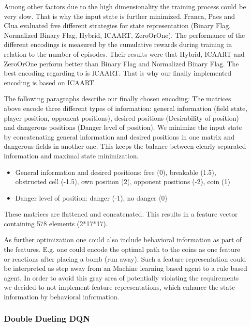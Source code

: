 Among other factors due to the high dimensionality the training process could be very slow. That is why the input state is further minimized.
Franca, Paes and Clua \cite{Franca2019} evaluated five different strategies for state representation (Binary Flag, Normalized Binary Flag, Hybrid, ICAART, ZeroOrOne). The performance of the different encodings is measured by the cumulative rewards during training in relation to the number of episodes. Their results were that Hybrid, ICAART and ZeroOrOne perform better than Binary Flag and Normalized Binary Flag. The best encoding regarding to \cite{Franca2019} is ICAART. That is why our finally implemented encoding is based on ICAART.

The following paragraphs describe our finally chosen encoding:
The matrices above encode three different types of information:
general information (field state, player position, opponent positions), desired positions (Desirability of position) and dangerous positions (Danger level of position).
We minimize the input state by concatenating general information and desired positions in one matrix and dangerous fields in another one. This keeps the balance between clearly separated information and maximal state minimization.

\begin{itemize}
	\item General information and desired positions: free (0), breakable (1.5), obstructed cell (-1.5), own position (2), opponent positions (-2), coin (1)
	\item Danger level of position: danger (-1), no danger (0)
\end{itemize}
These matrices are flattened and concatenated. This results in a feature vector containing 578 elements (2*17*17).

As further optimization one could also include behavioral information as part of the features. E.g. one could encode the optimal path to the coins as one feature or reactions after placing a bomb (run away).
Such a feature representation could be interpreted as step away from an Machine learning based agent to a rule based agent. In order to avoid this gray area of potentially violating the requirements we decided to not implement feature representations, which enhance the state information by behavioral information.


\subsubsection{Double Dueling DQN}
\label{ch:approachAb}

